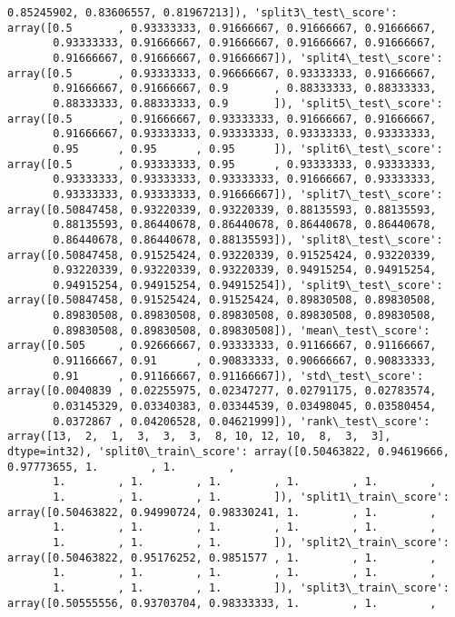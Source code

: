 \documentclass[11pt]{article}
\begin{document}
\begin{Verbatim}[commandchars=\\\{\}]
       0.85245902, 0.83606557, 0.81967213]), 'split3\_test\_score': array([0.5       , 0.93333333, 0.91666667, 0.91666667, 0.91666667,
       0.93333333, 0.91666667, 0.91666667, 0.91666667, 0.91666667,
       0.91666667, 0.91666667, 0.91666667]), 'split4\_test\_score': array([0.5       , 0.93333333, 0.96666667, 0.93333333, 0.91666667,
       0.91666667, 0.91666667, 0.9       , 0.88333333, 0.88333333,
       0.88333333, 0.88333333, 0.9       ]), 'split5\_test\_score': array([0.5       , 0.91666667, 0.93333333, 0.91666667, 0.91666667,
       0.91666667, 0.93333333, 0.93333333, 0.93333333, 0.93333333,
       0.95      , 0.95      , 0.95      ]), 'split6\_test\_score': array([0.5       , 0.93333333, 0.95      , 0.93333333, 0.93333333,
       0.93333333, 0.93333333, 0.93333333, 0.91666667, 0.93333333,
       0.93333333, 0.93333333, 0.91666667]), 'split7\_test\_score': array([0.50847458, 0.93220339, 0.93220339, 0.88135593, 0.88135593,
       0.88135593, 0.86440678, 0.86440678, 0.86440678, 0.86440678,
       0.86440678, 0.86440678, 0.88135593]), 'split8\_test\_score': array([0.50847458, 0.91525424, 0.93220339, 0.91525424, 0.93220339,
       0.93220339, 0.93220339, 0.93220339, 0.94915254, 0.94915254,
       0.94915254, 0.94915254, 0.94915254]), 'split9\_test\_score': array([0.50847458, 0.91525424, 0.91525424, 0.89830508, 0.89830508,
       0.89830508, 0.89830508, 0.89830508, 0.89830508, 0.89830508,
       0.89830508, 0.89830508, 0.89830508]), 'mean\_test\_score': array([0.505     , 0.92666667, 0.93333333, 0.91166667, 0.91166667,
       0.91166667, 0.91      , 0.90833333, 0.90666667, 0.90833333,
       0.91      , 0.91166667, 0.91166667]), 'std\_test\_score': array([0.0040839 , 0.02255975, 0.02347277, 0.02791175, 0.02783574,
       0.03145329, 0.03340383, 0.03344539, 0.03498045, 0.03580454,
       0.0372867 , 0.04206528, 0.04621999]), 'rank\_test\_score': array([13,  2,  1,  3,  3,  3,  8, 10, 12, 10,  8,  3,  3], dtype=int32), 'split0\_train\_score': array([0.50463822, 0.94619666, 0.97773655, 1.        , 1.        ,
       1.        , 1.        , 1.        , 1.        , 1.        ,
       1.        , 1.        , 1.        ]), 'split1\_train\_score': array([0.50463822, 0.94990724, 0.98330241, 1.        , 1.        ,
       1.        , 1.        , 1.        , 1.        , 1.        ,
       1.        , 1.        , 1.        ]), 'split2\_train\_score': array([0.50463822, 0.95176252, 0.9851577 , 1.        , 1.        ,
       1.        , 1.        , 1.        , 1.        , 1.        ,
       1.        , 1.        , 1.        ]), 'split3\_train\_score': array([0.50555556, 0.93703704, 0.98333333, 1.        , 1.        ,

\end{Verbatim}
\end{document}
